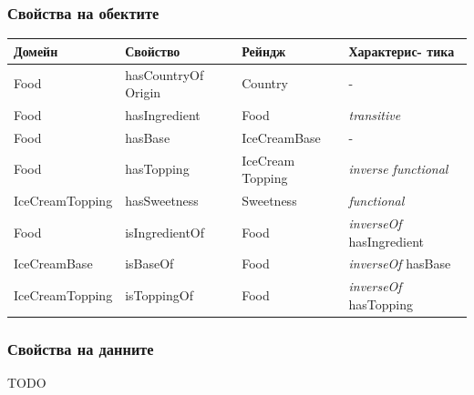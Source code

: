 \documentclass[12pt]{article}
\begin{document}
        \subsubsection{Свойства на обектите}
    
            \begin{table}[htbp]
                \centering
                \begin{tabularx}{\textwidth}{| X | X | X | X |}
                    \hline
                    \textbf{Домейн}          & \textbf{Свойство}     & \textbf{Рейндж}     & \textbf{Характерис- тика}         \\ \hline
                            
                    Food            & hasCountryOf Origin & Country         &           -                         \\ \hline
                    Food            & hasIngredient      & Food             & \textit{transitive}                 \\ \hline
                    Food            & hasBase            & IceCreamBase     &           -                         \\ \hline
                    Food            & hasTopping         & IceCream Topping & \textit{inverse functional}         \\ \hline
                    IceCreamTopping & hasSweetness       & Sweetness        & \textit{functional}                 \\ \hline
                    Food            & isIngredientOf     & Food             & \textit{inverseOf} hasIngredient    \\ \hline
                    IceCreamBase    & isBaseOf           & Food             & \textit{inverseOf} hasBase          \\ \hline
                    IceCreamTopping & isToppingOf        & Food             & \textit{inverseOf} hasTopping       \\ \hline
                            
                \end{tabularx}
            \end{table}
    
        \subsubsection{Свойства на данните}
    
            TODO
    
    
    
\end{document}
